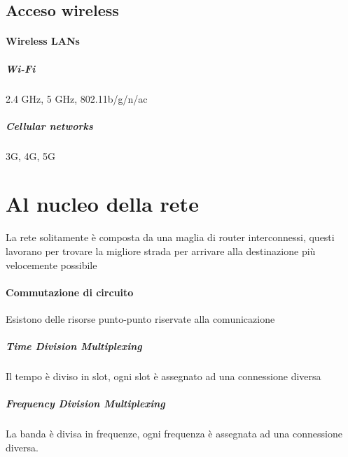         \subsection{Acceso wireless}
            \paragraph{Wireless LANs} 
                \subparagraph{Wi-Fi} 2.4 GHz, 5 GHz, 802.11b/g/n/ac
                \subparagraph{Cellular networks} 3G, 4G, 5G
    \section{Al nucleo della rete}
        La rete solitamente è composta da una maglia di router interconnessi, questi lavorano per trovare la migliore strada per arrivare alla destinazione più velocemente possibile
        \paragraph{Commutazione di circuito} Esistono delle risorse punto-punto riservate alla comunicazione
            \subparagraph{Time Division Multiplexing} Il tempo è diviso in slot, ogni slot è assegnato ad una connessione diversa
            \subparagraph{Frequency Division Multiplexing} La banda è divisa in frequenze, ogni frequenza è assegnata ad una connessione diversa.
